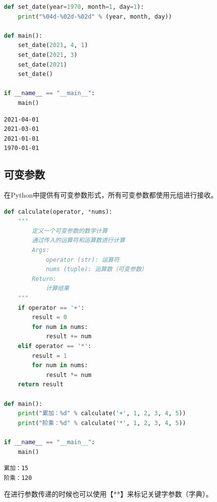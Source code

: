 
\begin{lstlisting}[language=Python]
def set_date(year=1970, month=1, day=1):
	print("%04d-%02d-%02d" % (year, month, day))

def main():
	set_date(2021, 4, 1)
	set_date(2021, 3)
	set_date(2021)
	set_date()

if __name__ == "__main__":
	main()
\end{lstlisting}

\begin{tcolorbox}
	\begin{verbatim}
2021-04-01
2021-03-01
2021-01-01
1970-01-01
\end{verbatim}
\end{tcolorbox}

\vspace{0.5cm}

\subsection{可变参数}

在Python中提供有可变参数形式，所有可变参数都使用元组进行接收。\\


\begin{lstlisting}[language=Python]
def calculate(operator, *nums):
	"""
		定义一个可变参数的数学计算
		通过传入的运算符和运算数进行计算
		Args:
			operator (str): 运算符
			nums (tuple): 运算数（可变参数）
		Return:
			计算结果
	"""
	if operator == '+':
		result = 0
		for num in nums:
			result += num
	elif operator == '*':
		result = 1
		for num in nums:
			result *= num
	return result

def main():
	print("累加：%d" % calculate('+', 1, 2, 3, 4, 5))
	print("阶乘：%d" % calculate('*', 1, 2, 3, 4, 5))

if __name__ == "__main__":
	main()
\end{lstlisting}

\begin{tcolorbox}
	\begin{verbatim}
累加：15
阶乘：120
\end{verbatim}
\end{tcolorbox}

在进行参数传递的时候也可以使用【**】来标记关键字参数（字典）。\\


